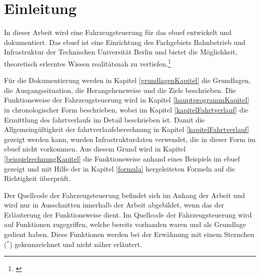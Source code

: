 \section{Einleitung}
In dieser Arbeit wird eine Fahrzeugsteuerung für das \ac{ebuef} entwickelt und dokumentiert. Das \ac{ebuef} ist eine Einrichtung des Fachgebiets Bahnbetrieb und Infrastruktur der Technischen Universität Berlin und bietet die Möglichkeit, theoretisch erlerntes Wissen realitätsnah zu vertiefen.\footnote{\cite{ebuef}}

Für die Dokumentierung werden in Kapitel \ref{grundlagenKapitel} die Grundlagen, die Ausgangssituation, die Herangehensweise und die Ziele beschrieben. Die Funktionsweise der Fahrzeugsteuerung wird in Kapitel \ref{hauptprogrammKapitel} in chronologischer Form beschrieben, wobei im Kapitel \ref{kapitelFahrtverlauf} die Ermittlung des \Gls{fahrtverlauf}s im Detail beschrieben ist. Damit die Allgemeingültigkeit der \Gls{fahrtverlauf}sberechnung in Kapitel \ref{kapitelFahrtverlauf} gezeigt werden kann, wurden Infrastrukturdaten verwendet, die in dieser Form im \ac{ebuef} nicht vorkommen. Aus diesem Grund wird in Kapitel \ref{beispielrechnungKapitel} die Funktionsweise anhand eines Beispiels im \ac{ebuef} gezeigt und mit Hilfe der in Kapitel \ref{formula} hergeleiteten Formeln auf die Richtigkeit überprüft.

Der Quellcode der Fahrzeugsteuerung befindet sich im Anhang der Arbeit und wird nur in Ausschnitten innerhalb der Arbeit abgebildet, wenn das der Erläuterung der Funktionsweise dient. Im Quellcode der Fahrzeugsteuerung wird auf Funktionen zugegriffen, welche bereits vorhanden waren und als Grundlage gedient haben. Diese Funktionen werden bei der Erwähnung mit einem Sternchen ($^\ast$) gekennzeichnet und nicht näher erläutert.